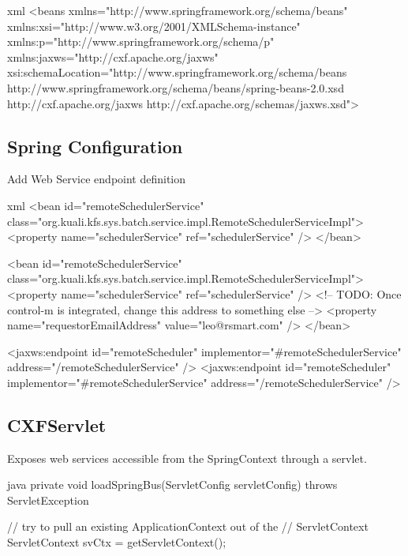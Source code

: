 \documentclass[12pt,notitlepage]{article}
\begin{document}
\begin{s5presentation}
\begin{s5slide}
    \begin{code}{xml}
<beans xmlns="http://www.springframework.org/schema/beans"
    xmlns:xsi="http://www.w3.org/2001/XMLSchema-instance"
    xmlns:p="http://www.springframework.org/schema/p"
    xmlns:jaxws="http://cxf.apache.org/jaxws"
    xsi:schemaLocation="http://www.springframework.org/schema/beans
        http://www.springframework.org/schema/beans/spring-beans-2.0.xsd
        http://cxf.apache.org/jaxws http://cxf.apache.org/schemas/jaxws.xsd">
    \end{code}
      
  \W \end{s5slide}

%
%
  \W \begin{s5slide}
    \section{Spring Configuration }
    Add Web Service endpoint definition

    \begin{code}{xml}
<bean id="remoteSchedulerService" class="org.kuali.kfs.sys.batch.service.impl.RemoteSchedulerServiceImpl">
    <property name="schedulerService" ref="schedulerService" />
</bean>
  
    <bean id="remoteSchedulerService" class="org.kuali.kfs.sys.batch.service.impl.RemoteSchedulerServiceImpl">
        <property name="schedulerService" ref="schedulerService" />
        <!--  TODO: Once control-m is integrated, change this address to something else -->
        <property name="requestorEmailAddress" value="leo@rsmart.com" />
    </bean>
  
	<jaxws:endpoint id="remoteScheduler" implementor="#remoteSchedulerService" address="/remoteSchedulerService" />
<jaxws:endpoint id="remoteScheduler" implementor="#remoteSchedulerService" address="/remoteSchedulerService" />
    \end{code}
      
  \W \end{s5slide}

%
%
  \W \begin{s5slide}
    \section{CXFServlet }
    Exposes web services accessible from the SpringContext through a servlet.
    \begin{code}{java}
private void loadSpringBus(ServletConfig servletConfig) throws ServletException {
    // try to pull an existing ApplicationContext out of the
    // ServletContext
    ServletContext svCtx = getServletContext();

}
\end{code}
\end{s5slide}
\end{s5presentation}
\end{document}
